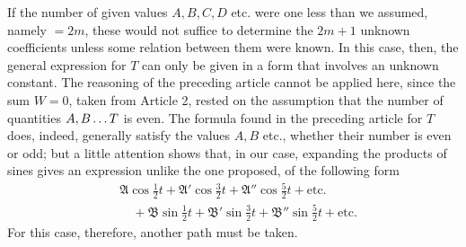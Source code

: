 
If the number of given values $A,B,C,D$ etc. were one less than
we assumed, namely $=2m$, these would not suffice to determine the $2m+1$ unknown coefficients unless some relation between them were known. In this case, then, the general expression for $T$ can only be given in a form that involves an unknown constant. The reasoning of the preceding article cannot be applied here, since the sum $W=0$, taken from Article 2, rested on the assumption that the number of
quantities $A,B\mathinner{.\,.\,.}T$ is even. The formula found in the preceding article for $T$ does, indeed, generally satisfy the values $A,B$ etc., whether their number is even
or odd; but a little attention shows that, in our case, expanding the products of sines
gives an expression unlike the one proposed, of the following form
\[
\begin{aligned}
&\mathfrak{A}\cos\tfrac12t+\mathfrak{A}'\cos\tfrac32t+\mathfrak{A}''\cos\tfrac52t+\text{etc.}\\
&\quad+\mathfrak{B}\sin\tfrac12t+\mathfrak{B}'\sin\tfrac32t+\mathfrak{B}''\sin\tfrac52t+\text{etc.}
\end{aligned}
\]
For this case, therefore, another path must be taken.

